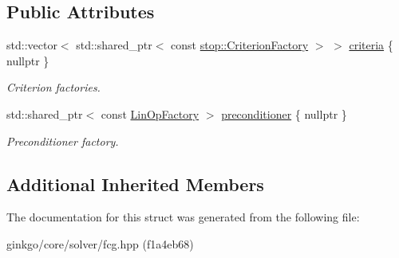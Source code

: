 \subsection*{Public Attributes}
\begin{DoxyCompactItemize}
\item 
\mbox{\label{structgko_1_1solver_1_1Fcg_1_1parameters__type_a4d322d51e9c1908b97a868746c191683}} 
std\+::vector$<$ std\+::shared\+\_\+ptr$<$ const \hyperlink{namespacegko_1_1stop_ab12a51109c50b35ec36dc5a393d6a9a0}{stop\+::\+Criterion\+Factory} $>$ $>$ \hyperlink{structgko_1_1solver_1_1Fcg_1_1parameters__type_a4d322d51e9c1908b97a868746c191683}{criteria} \{ nullptr \}
\begin{DoxyCompactList}\small\item\em Criterion factories. \end{DoxyCompactList}\item 
\mbox{\label{structgko_1_1solver_1_1Fcg_1_1parameters__type_afbdb7787925ef4294b12fe6851cfafd4}} 
std\+::shared\+\_\+ptr$<$ const \hyperlink{classgko_1_1LinOpFactory}{Lin\+Op\+Factory} $>$ \hyperlink{structgko_1_1solver_1_1Fcg_1_1parameters__type_afbdb7787925ef4294b12fe6851cfafd4}{preconditioner} \{ nullptr \}
\begin{DoxyCompactList}\small\item\em Preconditioner factory. \end{DoxyCompactList}\end{DoxyCompactItemize}
\subsection*{Additional Inherited Members}


The documentation for this struct was generated from the following file\+:\begin{DoxyCompactItemize}
\item 
ginkgo/core/solver/fcg.\+hpp (f1a4eb68)\end{DoxyCompactItemize}
